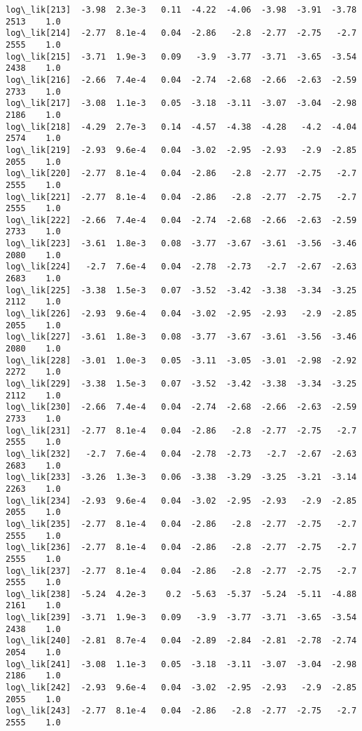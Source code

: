 \documentclass[11pt]{article}
\begin{document}
\begin{Verbatim}[commandchars=\\\{\}]
log\_lik[213]  -3.98  2.3e-3   0.11  -4.22  -4.06  -3.98  -3.91  -3.78   2513    1.0
log\_lik[214]  -2.77  8.1e-4   0.04  -2.86   -2.8  -2.77  -2.75   -2.7   2555    1.0
log\_lik[215]  -3.71  1.9e-3   0.09   -3.9  -3.77  -3.71  -3.65  -3.54   2438    1.0
log\_lik[216]  -2.66  7.4e-4   0.04  -2.74  -2.68  -2.66  -2.63  -2.59   2733    1.0
log\_lik[217]  -3.08  1.1e-3   0.05  -3.18  -3.11  -3.07  -3.04  -2.98   2186    1.0
log\_lik[218]  -4.29  2.7e-3   0.14  -4.57  -4.38  -4.28   -4.2  -4.04   2574    1.0
log\_lik[219]  -2.93  9.6e-4   0.04  -3.02  -2.95  -2.93   -2.9  -2.85   2055    1.0
log\_lik[220]  -2.77  8.1e-4   0.04  -2.86   -2.8  -2.77  -2.75   -2.7   2555    1.0
log\_lik[221]  -2.77  8.1e-4   0.04  -2.86   -2.8  -2.77  -2.75   -2.7   2555    1.0
log\_lik[222]  -2.66  7.4e-4   0.04  -2.74  -2.68  -2.66  -2.63  -2.59   2733    1.0
log\_lik[223]  -3.61  1.8e-3   0.08  -3.77  -3.67  -3.61  -3.56  -3.46   2080    1.0
log\_lik[224]   -2.7  7.6e-4   0.04  -2.78  -2.73   -2.7  -2.67  -2.63   2683    1.0
log\_lik[225]  -3.38  1.5e-3   0.07  -3.52  -3.42  -3.38  -3.34  -3.25   2112    1.0
log\_lik[226]  -2.93  9.6e-4   0.04  -3.02  -2.95  -2.93   -2.9  -2.85   2055    1.0
log\_lik[227]  -3.61  1.8e-3   0.08  -3.77  -3.67  -3.61  -3.56  -3.46   2080    1.0
log\_lik[228]  -3.01  1.0e-3   0.05  -3.11  -3.05  -3.01  -2.98  -2.92   2272    1.0
log\_lik[229]  -3.38  1.5e-3   0.07  -3.52  -3.42  -3.38  -3.34  -3.25   2112    1.0
log\_lik[230]  -2.66  7.4e-4   0.04  -2.74  -2.68  -2.66  -2.63  -2.59   2733    1.0
log\_lik[231]  -2.77  8.1e-4   0.04  -2.86   -2.8  -2.77  -2.75   -2.7   2555    1.0
log\_lik[232]   -2.7  7.6e-4   0.04  -2.78  -2.73   -2.7  -2.67  -2.63   2683    1.0
log\_lik[233]  -3.26  1.3e-3   0.06  -3.38  -3.29  -3.25  -3.21  -3.14   2263    1.0
log\_lik[234]  -2.93  9.6e-4   0.04  -3.02  -2.95  -2.93   -2.9  -2.85   2055    1.0
log\_lik[235]  -2.77  8.1e-4   0.04  -2.86   -2.8  -2.77  -2.75   -2.7   2555    1.0
log\_lik[236]  -2.77  8.1e-4   0.04  -2.86   -2.8  -2.77  -2.75   -2.7   2555    1.0
log\_lik[237]  -2.77  8.1e-4   0.04  -2.86   -2.8  -2.77  -2.75   -2.7   2555    1.0
log\_lik[238]  -5.24  4.2e-3    0.2  -5.63  -5.37  -5.24  -5.11  -4.88   2161    1.0
log\_lik[239]  -3.71  1.9e-3   0.09   -3.9  -3.77  -3.71  -3.65  -3.54   2438    1.0
log\_lik[240]  -2.81  8.7e-4   0.04  -2.89  -2.84  -2.81  -2.78  -2.74   2054    1.0
log\_lik[241]  -3.08  1.1e-3   0.05  -3.18  -3.11  -3.07  -3.04  -2.98   2186    1.0
log\_lik[242]  -2.93  9.6e-4   0.04  -3.02  -2.95  -2.93   -2.9  -2.85   2055    1.0
log\_lik[243]  -2.77  8.1e-4   0.04  -2.86   -2.8  -2.77  -2.75   -2.7   2555    1.0

\end{Verbatim}
\end{document}
